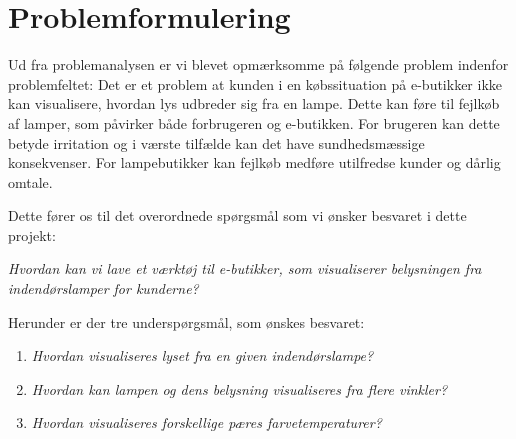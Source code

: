 \section{Problemformulering}
\label{sec:problemformulering}

Ud fra problemanalysen er vi blevet opmærksomme på følgende problem indenfor problemfeltet:
Det er et problem at kunden i en købssituation på e-butikker ikke kan visualisere, hvordan lys udbreder sig fra en lampe. Dette kan føre til fejlkøb af lamper, som påvirker både forbrugeren og e-butikken. For brugeren kan dette betyde irritation og i værste tilfælde kan det have sundhedsmæssige konsekvenser. For lampebutikker kan fejlkøb medføre utilfredse kunder og dårlig omtale. 

Dette fører os til det overordnede spørgsmål som vi ønsker besvaret i dette projekt:

\textit{Hvordan kan vi lave et værktøj til e-butikker, som visualiserer belysningen fra indendørslamper for kunderne?}

Herunder er der tre underspørgsmål, som ønskes besvaret:

\begin{enumerate}

\item \textit{Hvordan visualiseres lyset fra en given indendørslampe?}
\item \textit{Hvordan kan lampen og dens belysning visualiseres fra flere vinkler?}
\item \textit{Hvordan visualiseres forskellige pæres farvetemperaturer?}

\end{enumerate}

\clearpage